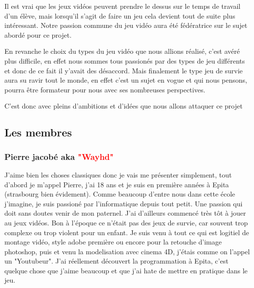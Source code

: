 \documentclass{article}
\begin{document}
\par
Il est vrai que les jeux vidéos peuvent prendre le dessus sur le temps de travail  d'un élève, mais lorsqu'il s'agit de faire un jeu cela devient tout de suite plus intéressant. Notre passion commune du  jeu  vidéo aura été fédératrice sur le sujet  abordé pour ce projet.
\newline

\par
En  revanche le choix du types du jeu vidéo que nous allions réalisé, c'est avéré plus difficile, en effet nous sommes tous passionés par des types de jeu différents et donc de  ce fait il y'avait des désaccord. Mais finalement le type jeu de survie aura su ravir tout le monde, en effet c'est un sujet  en vogue et qui nous pensons, pourra être formateur pour nous avec ses nombreuses perspectives. 
\newline

\par
C'est donc avec pleins d'ambitions et d'idées que nous allons attaquer ce  projet



\newpage
\subsection{Les  membres}
\subsubsection{Pierre jacobé aka \textcolor{red}{"Wayhd"}}

\par
J'aime bien les choses classiques donc je vais me présenter simplement, tout d'abord je m'appel Pierre, j'ai 18 ans et je suis  en première années à  Epita  (strasbourg bien évidement). Comme beaucoup  d'entre nous dans cette école j'imagine, je suis passioné par l'informatique depuis tout petit. Une passion qui doit sans doutes venir de mon paternel. J'ai d'ailleurs commencé très tôt à jouer au jeux vidéos. Bon à l'époque ce n'était pas des jeux de survie, car souvent trop complexe ou trop violent pour un enfant. Je suis venu à tout ce qui est logitiel de montage vidéo, style adobe première ou encore pour la retouche d'image photoshop, puis et venu la modelisation avec cinema 4D, j'étais comme on l'appel un "Youtubeur". J'ai réellement découvert la programmation à Epita, c'est quelque chose que j'aime beaucoup et que j'ai hate de mettre en pratique dans le jeu.
\newline
\end{document}
